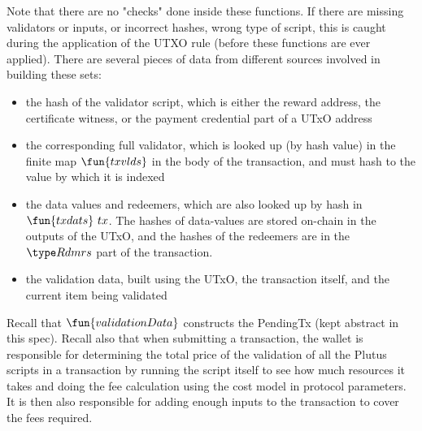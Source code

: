Note that there are no "checks" done inside these functions. If there are
missing validators or inputs, or incorrect hashes, wrong type of script,
this is caught during the application of the UTXO
rule (before these functions are ever applied).
There are several pieces of data from different sources involved in building these
sets:

\begin{itemize}
\item the hash of the validator script, which is either the reward address,
the certificate witness, or the payment credential part of a UTxO address

\item the corresponding
full validator, which is looked up (by hash value) in the finite map $\fun{txvlds}$ in the
body of the transaction, and must hash to the value by which it is indexed

\item the data values and redeemers, which are also looked up by hash in $\fun{txdats}~{tx}$.
The hashes of data-values are stored on-chain in the outputs of the UTxO, and
the hashes of the redeemers are in the $\Rdmrs$ part of the transaction.

\item the validation data, built using the UTxO, the transaction itself,
and the current item being validated
\end{itemize}

Recall that $\fun{validationData}$ constructs the PendingTx (kept abstract
in this spec).
Recall also that when submitting a transaction, the wallet is responsible for
determining the total price of the
validation of all the Plutus scripts in a transaction
by running the script itself to see how much resources it takes and doing the
fee calculation using the cost model in protocol parameters. It is then
also responsible for adding enough inputs to the transaction to cover the
fees required.

